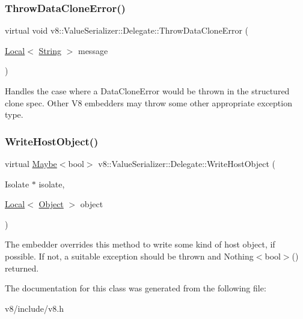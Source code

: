 \subsubsection{\texorpdfstring{Throw\+Data\+Clone\+Error()}{ThrowDataCloneError()}}
{\footnotesize\ttfamily virtual void v8\+::\+Value\+Serializer\+::\+Delegate\+::\+Throw\+Data\+Clone\+Error (\begin{DoxyParamCaption}\item[{\mbox{\hyperlink{classv8_1_1Local}{Local}}$<$ \mbox{\hyperlink{classv8_1_1String}{String}} $>$}]{message }\end{DoxyParamCaption})\hspace{0.3cm}{\ttfamily [pure virtual]}}

Handles the case where a Data\+Clone\+Error would be thrown in the structured clone spec. Other V8 embedders may throw some other appropriate exception type. \mbox{\label{classv8_1_1ValueSerializer_1_1Delegate_ae97808060b22d7a94517f725922b72c6}} 
\subsubsection{\texorpdfstring{Write\+Host\+Object()}{WriteHostObject()}}
{\footnotesize\ttfamily virtual \mbox{\hyperlink{classv8_1_1Maybe}{Maybe}}$<$bool$>$ v8\+::\+Value\+Serializer\+::\+Delegate\+::\+Write\+Host\+Object (\begin{DoxyParamCaption}\item[{Isolate $\ast$}]{isolate,  }\item[{\mbox{\hyperlink{classv8_1_1Local}{Local}}$<$ \mbox{\hyperlink{classv8_1_1Object}{Object}} $>$}]{object }\end{DoxyParamCaption})\hspace{0.3cm}{\ttfamily [virtual]}}

The embedder overrides this method to write some kind of host object, if possible. If not, a suitable exception should be thrown and Nothing$<$bool$>$() returned. 

The documentation for this class was generated from the following file\+:\begin{DoxyCompactItemize}
\item 
v8/include/v8.\+h\end{DoxyCompactItemize}
